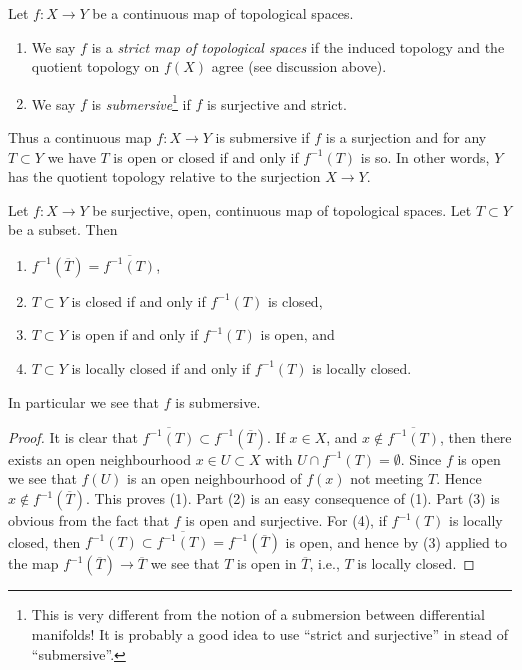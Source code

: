 \begin{definition}
\label{definition-submersive}
Let $f : X \to Y$ be a continuous map of topological spaces.
\begin{enumerate}
\item We say $f$ is a {\it strict map of topological spaces}
if the induced topology and the quotient topology on $f(X)$ agree
(see discussion above).
\item We say $f$ is {\it submersive}\footnote{This is very different from
the notion of a submersion between differential manifolds! It is probably
a good idea to use ``strict and surjective'' in stead of ``submersive''.}
if $f$ is surjective and strict.
\end{enumerate}
\end{definition}

\noindent
Thus a continuous map $f : X \to Y$ is submersive if $f$
is a surjection and for any $T \subset Y$ we have
$T$ is open or closed if and only if $f^{-1}(T)$ is so.
In other words, $Y$ has the
quotient topology relative to the surjection $X \to Y$.

\begin{lemma}
\label{lemma-open-morphism-quotient-topology}
Let $f : X \to Y$ be surjective, open, continuous map of topological spaces.
Let $T \subset Y$ be a subset. Then
\begin{enumerate}
\item $f^{-1}(\overline{T}) = \overline{f^{-1}(T)}$,
\item $T \subset Y$ is closed if and only if $f^{-1}(T)$ is closed,
\item $T \subset Y$ is open if and only if $f^{-1}(T)$ is open, and
\item $T \subset Y$ is locally closed if and only if $f^{-1}(T)$
is locally closed.
\end{enumerate}
In particular we see that $f$ is submersive.
\end{lemma}

\begin{proof}
It is clear that $\overline{f^{-1}(T)} \subset f^{-1}(\overline{T})$.
If $x \in X$, and $x \not \in \overline{f^{-1}(T)}$, then there
exists an open neighbourhood $x \in U \subset X$ with
$U \cap f^{-1}(T) = \emptyset$. Since $f$ is open we see that
$f(U)$ is an open neighbourhood of $f(x)$ not meeting $T$.
Hence $x \not \in f^{-1}(\overline{T})$. This proves (1).
Part (2) is an easy consequence of (1).
Part (3) is obvious from the fact that $f$ is open and surjective.
For (4), if $f^{-1}(T)$ is locally closed, then
$f^{-1}(T) \subset \overline{f^{-1}(T)} = f^{-1}(\overline{T})$
is open, and hence by (3) applied to the map
$f^{-1}(\overline{T}) \to \overline{T}$ we see that
$T$ is open in $\overline{T}$, i.e., $T$ is locally closed.
\end{proof}

